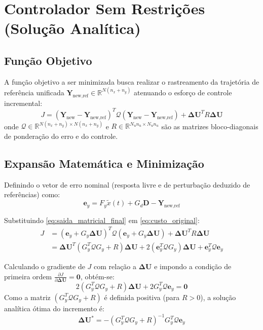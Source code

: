 \documentclass[12pt]{article}
\begin{document}
\section{Controlador Sem Restrições (Solução Analítica)}

\subsection{Função Objetivo}
A função objetivo a ser minimizada busca realizar o rastreamento da trajetória de referência unificada $\bm{Y}_{\text{new,ref}} \in \mathbb{R}^{N(n_x+n_y)}$ atenuando o esforço de controle incremental:
\begin{equation}
\label{eq:custo_original}
J = (\bm{Y}_{\text{new}} - \bm{Y}_{\text{new,ref}})^T \mathcal{Q} (\bm{Y}_{\text{new}} - \bm{Y}_{\text{new,ref}}) + \bm{\Delta U}^T R \bm{\Delta U}
\end{equation}
onde $\mathcal{Q} \in \mathbb{R}^{N(n_x+n_y) \times N(n_x+n_y)}$ e $R \in \mathbb{R}^{N_u n_u \times N_u n_u}$ são as matrizes bloco-diagonais de ponderação do erro e do controle.

\subsection{Expansão Matemática e Minimização}
Definindo o vetor de erro nominal (resposta livre e de perturbação deduzido de referências) como:
\begin{equation}
\bm{e}_y = F_y \tilde{x}(t) + G_d \bm{D} - \bm{Y}_{\text{new,ref}}
\end{equation}

Substituindo \eqref{eq:saida_matricial_final} em \eqref{eq:custo_original}:
\begin{align}
J &= (\bm{e}_y + G_y \bm{\Delta U})^T \mathcal{Q} (\bm{e}_y + G_y \bm{\Delta U}) + \bm{\Delta U}^T R \bm{\Delta U} \nonumber \\
  &= \bm{\Delta U}^T \left( G_y^T \mathcal{Q} G_y + R \right) \bm{\Delta U} + 2 \left( \bm{e}_y^T \mathcal{Q} G_y \right) \bm{\Delta U} + \bm{e}_y^T \mathcal{Q} \bm{e}_y
\end{align}

Calculando o gradiente de $J$ com relação a $\bm{\Delta U}$ e impondo a condição de primeira ordem $\frac{\partial J}{\partial \bm{\Delta U}} = \bm{0}$, obtém-se:
\begin{equation}
2 \left( G_y^T \mathcal{Q} G_y + R \right) \bm{\Delta U} + 2 G_y^T \mathcal{Q} \bm{e}_y = \bm{0}
\end{equation}
Como a matriz $\left( G_y^T \mathcal{Q} G_y + R \right)$ é definida positiva (para $R > 0$), a solução analítica ótima do incremento é:
\begin{equation}
\label{eq:solucao_analitica_completa}
\bm{\Delta U}^* = -\left( G_y^T \mathcal{Q} G_y + R \right)^{-1} G_y^T \mathcal{Q} \bm{e}_y
\end{equation}
\end{document}
